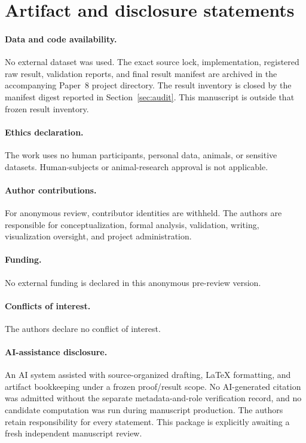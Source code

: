 \documentclass[11pt]{article}
\theoremstyle{definition}
\theoremstyle{remark}
\begin{document}
\section{Artifact and disclosure statements}
\label{app:statements}

\paragraph{Data and code availability.}
No external dataset was used.  The exact source lock, implementation,
registered raw result, validation reports, and final result manifest are
archived in the accompanying Paper~8 project directory.  The result
inventory is closed by the manifest digest reported in
Section~\ref{sec:audit}.  This manuscript is outside that frozen result
inventory.

\paragraph{Ethics declaration.}
The work uses no human participants, personal data, animals, or sensitive
datasets.  Human-subjects or animal-research approval is not applicable.

\paragraph{Author contributions.}
For anonymous review, contributor identities are withheld.  The authors are
responsible for conceptualization, formal analysis, validation, writing,
visualization oversight, and project administration.

\paragraph{Funding.}
No external funding is declared in this anonymous pre-review version.

\paragraph{Conflicts of interest.}
The authors declare no conflict of interest.

\paragraph{AI-assistance disclosure.}
An AI system assisted with source-organized drafting, LaTeX formatting, and
artifact bookkeeping under a frozen proof/result scope.  No AI-generated
citation was admitted without the separate metadata-and-role verification
record, and no candidate computation was run during manuscript production.
The authors retain responsibility for every statement.  This package is
explicitly awaiting a fresh independent manuscript review.



\end{document}
